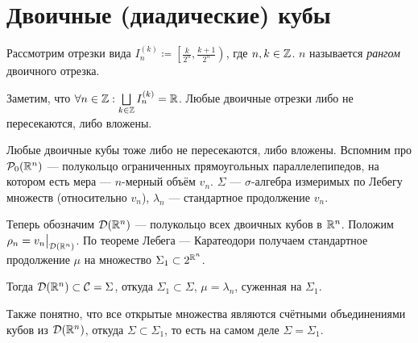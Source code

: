 \documentclass[a4paper]{report}
\begin{document}
    \section{Двоичные (диадические) кубы}
    Рассмотрим отрезки вида $I_n^{(k)} \coloneqq \left[\frac{k}{2^n}, \frac{k + 1}{2^n}\right)$, где $n,k \in \mathbb{Z}$.
    $n$ называется \emph{рангом} двоичного отрезка.

    Заметим, что $\forall n \in \mathbb{Z}: \bigsqcup\limits_{k \in \mathbb{Z}}I_n^{(k)} = \mathbb{R}$.
    Любые двоичные отрезки либо не пересекаются, либо вложены.

    Любые двоичные кубы тоже либо не пересекаются, либо вложены.
    Вспомним про $\mathcal{P}_0(\mathbb{R}^n)$ --- полукольцо ограниченных прямоугольных параллелепипедов, на котором есть мера --- $n$-мерный объём $v_n$.
    $\Sigma$ --- $\sigma$-алгебра измеримых по Лебегу множеств (относительно $v_n$), $\lambda_n$ --- стандартное продолжение $v_n$.

    Теперь обозначим $\mathcal{D}(\mathbb{R}^n)$ --- полукольцо всех двоичных кубов в $\mathbb{R}^n$.
    Положим $\rho_n = v_n\big|_{\mathcal{D}(\mathbb{R}^n)}$.
    По теореме Лебега --- Каратеодори получаем стандартное продолжение $\mu$ на множество $\Sigma_1 \subset 2^{\mathbb{R}^n}$.

    Тогда $\mathcal{D}(\mathbb{R}^n) \subset \mathcal{C} = \Sigma$, откуда $\Sigma_1 \subset \Sigma$, $\mu = \lambda_n$, суженная на $\Sigma_1$.

    Также понятно, что все открытые множества являются счётными объединениями кубов из $\mathcal{D}(\mathbb{R}^n)$, откуда $\Sigma \subset \Sigma_1$, то есть на самом деле $\Sigma = \Sigma_1$.
\end{document}

